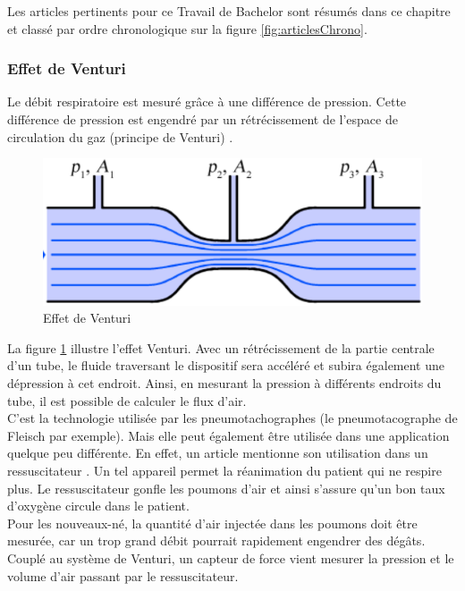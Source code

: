 Les articles pertinents pour ce Travail de Bachelor sont résumés dans ce chapitre et classé par ordre chronologique sur la figure 
\ref{fig:articlesChrono}. 

\subsubsection{Effet de Venturi}
Le débit respiratoire est mesuré grâce à une différence de pression. Cette différence de pression est engendré par un rétrécissement de 
l'espace de circulation du gaz (principe de Venturi) \cite{oberg_biomedical_2011}. 
\begin{figure}[H]
    \centering
    \includegraphics[scale = 0.5]{assets/figures/Venturi.png}
    \caption{Effet de Venturi \cite{oberg_biomedical_2011}}
    \label{fig:venturi}
\end{figure}

La figure \ref{fig:venturi} illustre l'effet Venturi. Avec un rétrécissement de la partie centrale d'un tube, le fluide traversant le dispositif 
sera accéléré et subira également une dépression à cet endroit. Ainsi, en mesurant la pression à différents endroits du tube, il est possible 
de calculer le flux d'air. \\

C'est la technologie utilisée par les pneumotachographes (le pneumotacographe de Fleisch par exemple). Mais elle peut également être utilisée 
dans une application quelque peu différente. En effet, un article mentionne son utilisation dans un ressuscitateur \cite{jacq_ultra-low_2011}. 
Un tel appareil permet la réanimation du patient qui ne respire plus. Le ressuscitateur gonfle les poumons d'air et ainsi s'assure qu'un bon 
taux d'oxygène circule dans le patient. \\
Pour les nouveaux-né, la quantité d'air injectée dans les poumons doit être mesurée, car un trop grand débit pourrait rapidement engendrer 
des dégâts. \\
Couplé au système de Venturi, un capteur de force vient mesurer la pression et le volume d'air passant par le ressuscitateur. 

